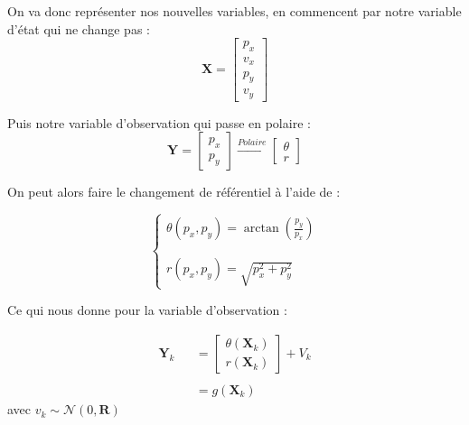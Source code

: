 On va donc représenter nos nouvelles variables, en commencent par notre variable d'état qui ne change pas :
\begin{equation}
	\mathbf{X} =\begin{bmatrix}
		p_{x}\\
		v_{x}\\
		p_{y}\\
		v_{y}
	\end{bmatrix}
\end{equation}

Puis notre variable d'observation qui passe en polaire :
\begin{equation}
	\mathbf{Y} =\begin{bmatrix}
		p_{x}\\
		p_{y}
	\end{bmatrix}\xrightarrow{Polaire}\begin{bmatrix}
		\theta \\
		r
	\end{bmatrix}
\end{equation}

On peut alors faire le changement de référentiel à l'aide de :

\begin{equation}
	\begin{cases}
		\theta ( p_{x} ,p_{y}) =\arctan\left(\frac{p_{y}}{p_{x}}\right)\\
		\\\\
		r( p_{x} ,p_{y}) =\sqrt{p_{x}^{2} +p_{y}^{2}}
	\end{cases}
\end{equation}

Ce qui nous donne pour la variable d'observation :


\begin{equation}
	\begin{aligned}
		\mathbf{Y}_{k} & & =\begin{bmatrix}
			\theta (\mathbf{X}_{k})\\
			r(\mathbf{X}_{k})
		\end{bmatrix} +V_{k}\\
		& & \\
		& & =g(\mathbf{X}_{k})
	\end{aligned}
\end{equation}
avec $\displaystyle v_{k} \sim \mathcal{N}( 0,\mathbf{R})$


